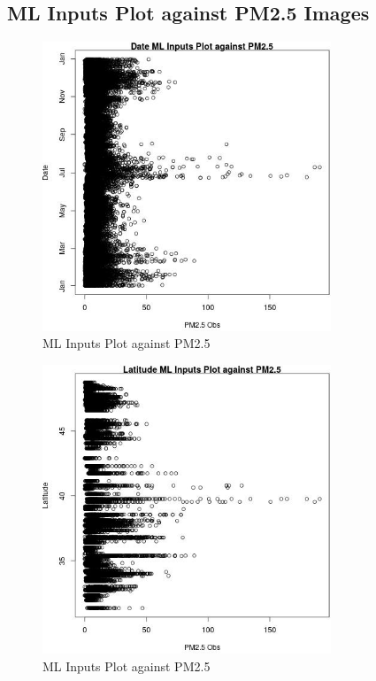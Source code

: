 
\subsection{ML Inputs Plot against PM2.5 Images} 
 

\begin{figure} 
\centering  
\includegraphics[width=0.77\textwidth]{Code_Outputs/Report_ML_input_PM25_Step4_part_e_de_duplicated_aves_DatevPM25_Obs.jpg} 
\caption{\label{fig:Report_ML_input_PM25_Step4_part_e_de_duplicated_avesDatevPM25_Obs}ML Inputs Plot against PM2.5} 
\end{figure} 
 

\begin{figure} 
\centering  
\includegraphics[width=0.77\textwidth]{Code_Outputs/Report_ML_input_PM25_Step4_part_e_de_duplicated_aves_LatitudevPM25_Obs.jpg} 
\caption{\label{fig:Report_ML_input_PM25_Step4_part_e_de_duplicated_avesLatitudevPM25_Obs}ML Inputs Plot against PM2.5} 
\end{figure} 
 


